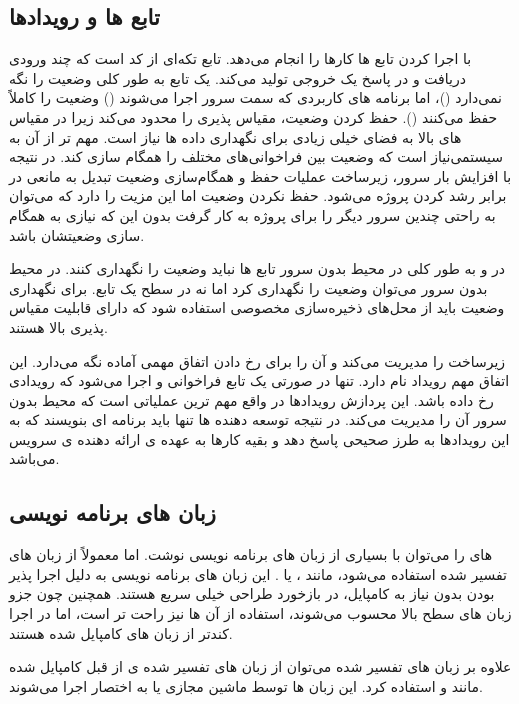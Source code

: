 \subsection{تابع ها و رویدادها}

 با اجرا کردن تابع ها کارها را انجام می‌دهد. تابع تکه‌ای از کد است که چند ورودی دریافت و در پاسخ یک خروجی تولید می‌کند. یک تابع به طور کلی وضعیت را نگه نمی‌دارد ()، اما برنامه های کاربردی که سمت سرور اجرا می‌شوند (‌) وضعیت را کاملاً حفظ می‌کنند (). حفظ کردن وضعیت، مقیاس پذیری را محدود می‌کند زیرا در مقیاس های بالا به فضای خیلی زیادی برای نگهداری داده ها نیاز است. مهم تر از آن به سیستمی‌نیاز است که وضعیت بین فراخوانی‌های مختلف را همگام سازی کند. در نتیجه با افزایش بار سرور، زیرساخت عملیات حفظ و همگام‌سازی وضعیت تبدیل به مانعی در برابر رشد کردن پروژه می‌شود. حفظ نکردن وضعیت اما این مزیت را دارد که می‌توان به راحتی چندین سرور دیگر را برای پروژه به کار گرفت بدون این که نیازی به همگام سازی وضعیتشان باشد.

در  و به طور کلی در محیط بدون سرور تابع ها نباید وضعیت را نگهداری کنند. در محیط بدون سرور می‌توان وضعیت را نگهداری کرد اما نه در سطح یک تابع. برای نگهداری وضعیت باید از محل‌های ذخیره‌سازی مخصوصی استفاده شود که دارای قابلیت مقیاس پذیری بالا هستند.

 زیرساخت را مدیریت می‌کند و آن را برای رخ دادن اتفاق مهمی آماده نگه می‌دارد. این اتفاق مهم رویداد نام دارد. تنها در صورتی یک تابع فراخوانی و اجرا می‌شود که رویدادی رخ داده باشد. این پردازش رویدادها در واقع مهم ترین عملیاتی است که محیط بدون سرور آن را مدیریت می‌کند. در نتیجه توسعه دهنده ها تنها باید برنامه ای بنویسند که به این رویدادها به طرز صحیحی پاسخ دهد و بقیه کارها به عهده ی ارائه دهنده ی سرویس می‌باشد.

\subsection{زبان های برنامه نویسی }

 های  را می‌توان با بسیاری از زبان های برنامه نویسی نوشت. اما معمولاً از زبان های تفسیر شده استفاده می‌شود، مانند ،  یا . این زبان های برنامه نویسی به دلیل اجرا پذیر بودن بدون نیاز به کامپایل، در بازخورد طراحی خیلی سریع هستند. همچنین چون جزو زبان های سطح بالا محسوب می‌شوند، استفاده از آن ها نیز راحت تر است، اما در اجرا کندتر از زبان های کامپایل شده هستند.

علاوه بر زبان های تفسیر شده می‌توان از زبان های تفسیر شده ی از قبل کامپایل شده مانند  و  استفاده کرد. این زبان ها توسط ماشین مجازی  یا به اختصار  اجرا می‌شوند.

